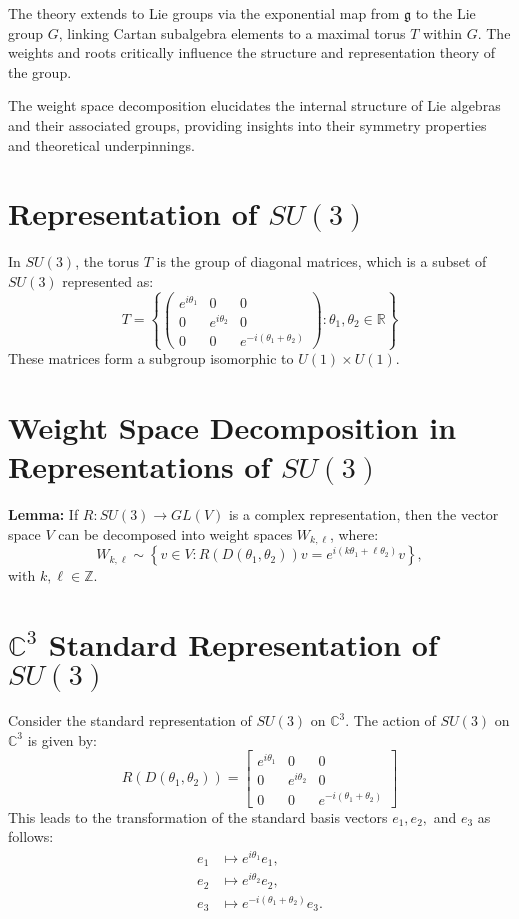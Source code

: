\documentclass{article}
\begin{document}
The theory extends to Lie groups via the exponential map from \(\mathfrak{g}\) to the Lie group \(G\), linking Cartan subalgebra elements to a maximal torus \(T\) within \(G\). The weights and roots critically influence the structure and representation theory of the group.

The weight space decomposition elucidates the internal structure of Lie algebras and their associated groups, providing insights into their symmetry properties and theoretical underpinnings.


\section*{Representation of \(SU(3)\)}

In \(SU(3)\), the torus \(T\) is the group of diagonal matrices, which is a subset of \(SU(3)\) represented as:
\[
T = \left\{ 
\begin{pmatrix} 
e^{i\theta_1} & 0 & 0 \\ 
0 & e^{i\theta_2} & 0 \\ 
0 & 0 & e^{-i(\theta_1+\theta_2)} 
\end{pmatrix}
: \theta_1, \theta_2 \in \mathbb{R} 
\right\}
\]
These matrices form a subgroup isomorphic to \(U(1) \times U(1)\).

\section*{Weight Space Decomposition in Representations of \(SU(3)\)}

\textbf{Lemma:} If \( R: SU(3) \rightarrow GL(V) \) is a complex representation, then the vector space \( V \) can be decomposed into weight spaces \( W_{k,\ell} \), where:
\[
W_{k,\ell} \sim \left\{ v \in V : R(D(\theta_1, \theta_2))v = e^{i(k\theta_1 + \ell\theta_2)}v \right\},
\]
with \( k, \ell \in \mathbb{Z} \).

\section*{\( \mathbb{C}^3 \) Standard Representation of \( SU(3) \)}

Consider the standard representation of \( SU(3) \) on \( \mathbb{C}^3 \). The action of \( SU(3) \) on \( \mathbb{C}^3 \) is given by:
\[
R(D(\theta_1, \theta_2)) = 
\begin{bmatrix} 
e^{i\theta_1} & 0 & 0 \\ 
0 & e^{i\theta_2} & 0 \\ 
0 & 0 & e^{-i(\theta_1+\theta_2)} 
\end{bmatrix}
\]
This leads to the transformation of the standard basis vectors \( e_1, e_2, \) and \( e_3 \) as follows:
\begin{align*}
e_1 & \mapsto e^{i\theta_1} e_1, \\
e_2 & \mapsto e^{i\theta_2} e_2, \\
e_3 & \mapsto e^{-i(\theta_1+\theta_2)} e_3.
\end{align*}
\end{document}
